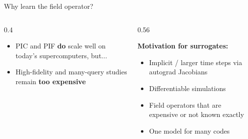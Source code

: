 \documentclass[aspectratio=169]{beamer}
\newcommand{\hl}[1]{{\color{fzjblue}\textbf{#1}}}
\begin{document}
\begin{frame}{Why learn the field operator?}
  \centering
  \vspace{2pt}
  \begin{columns}[t]
    \begin{column}{0.4\textwidth}
      \begin{itemize}\small
        \item PIC and PIF \hl{do} scale well on today's supercomputers, but...
        \item High-fidelity and many-query studies remain \hl{too expensive}
      \end{itemize}
    \end{column}
      \vspace{8pt}
    \begin{column}{0.56\textwidth}

      {\small\textbf{Motivation for surrogates:}}
      \begin{itemize}\scriptsize
        \item Implicit / larger time steps via autograd Jacobians
        \item Differentiable simulations
        \item Field operators that are expensive or not known exactly
        \item One model for many codes
      \end{itemize}
    \end{column}
  \end{columns}
  \vspace{4pt}
\end{frame}
\end{document}
